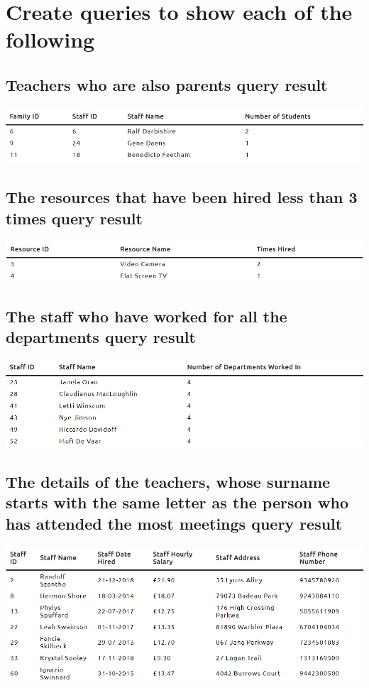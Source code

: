 \documentclass{article}
\begin{document}
\section{Create queries to show each of the following}
\subsection{Teachers who are also parents query result}
\includegraphics[width=\linewidth]{images/07.png}
\subsection{The resources that have been hired less than 3 times query result}
\includegraphics[width=\linewidth]{images/08.png}
\subsection{The staff who have worked for all the departments query result}
\includegraphics[width=\linewidth]{images/09.png}
\subsection{The details of the teachers, whose surname starts with the same letter as the person who has attended the most meetings query result}
\includegraphics[width=\linewidth]{images/10.png}

\newpage

\printglossary[type=\acronymtype]
 
\printglossary

\lstlistoflistings
\end{document}
